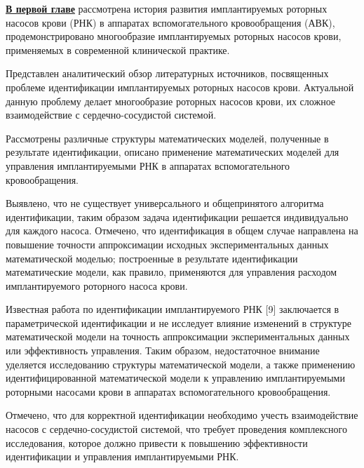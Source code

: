 \underline{\textbf{В первой главе}} рассмотрена история развития имплантируемых роторных насосов крови (РНК) в аппаратах вспомогательного кровообращения (АВК), продемонстрировано многообразие имплантируемых роторных насосов крови, применяемых в современной клинической практике.

Представлен аналитический обзор литературных источников, посвященных проблеме идентификации имплантируемых роторных насосов крови. Актуальной данную проблему делает многообразие роторных насосов крови, их сложное взаимодействие с сердечно-сосудистой системой.

Рассмотрены различные структуры математических моделей, полученные в результате идентификации, описано применение математических моделей для управления имплантируемыми РНК в аппаратах вспомогательного кровообращения.


Выявлено, что не существует универсального и общепринятого алгоритма идентификации, таким образом задача идентификации решается индивидуально для каждого насоса. Отмечено, что идентификация в общем случае направлена на повышение точности аппроксимации исходных экспериментальных данных математической моделью; построенные в результате идентификации математические модели, как правило, применяются для управления расходом имплантируемого роторного насоса крови.

Известная работа по идентификации имплантируемого РНК [9] заключается в параметрической идентификации и не исследует влияние изменений в структуре математической модели на точность аппроксимации экспериментальных данных или эффективность управления. Таким образом, недостаточное внимание уделяется исследованию структуры математической модели, а также применению идентифицированной математической модели к управлению имплантируемыми роторными насосами крови в аппаратах вспомогательного кровообращения.

Отмечено, что для корректной идентификации необходимо учесть взаимодействие насосов с сердечно-сосудистой системой, что требует проведения комплексного исследования, которое должно привести к повышению эффективности идентификации и управления имплантируемыми РНК.




